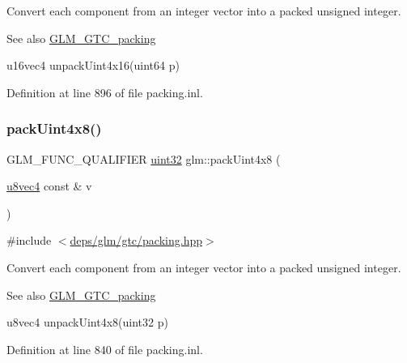 Convert each component from an integer vector into a packed unsigned integer.

\begin{DoxySeeAlso}{See also}
\hyperlink{group__gtc__packing}{G\+L\+M\+\_\+\+G\+T\+C\+\_\+packing} 

u16vec4 unpack\+Uint4x16(uint64 p) 
\end{DoxySeeAlso}


Definition at line 896 of file packing.\+inl.

\mbox{\label{group__gtc__packing_gaeb4262f799821affa62edf7067deaef9}} 
\subsubsection{\texorpdfstring{pack\+Uint4x8()}{packUint4x8()}}
{\footnotesize\ttfamily G\+L\+M\+\_\+\+F\+U\+N\+C\+\_\+\+Q\+U\+A\+L\+I\+F\+I\+ER \hyperlink{group__gtc__type__precision_ga202b6a53c105fcb7e531f9b443518451}{uint32} glm\+::pack\+Uint4x8 (\begin{DoxyParamCaption}\item[{\hyperlink{group__gtc__type__precision_ga6c8841fa492bd5b1078b171452fd6974}{u8vec4} const \&}]{v }\end{DoxyParamCaption})}



{\ttfamily \#include $<$\hyperlink{gtc_2packing_8hpp}{deps/glm/gtc/packing.\+hpp}$>$}

Convert each component from an integer vector into a packed unsigned integer.

\begin{DoxySeeAlso}{See also}
\hyperlink{group__gtc__packing}{G\+L\+M\+\_\+\+G\+T\+C\+\_\+packing} 

u8vec4 unpack\+Uint4x8(uint32 p) 
\end{DoxySeeAlso}


Definition at line 840 of file packing.\+inl.

\mbox{\label{group__gtc__packing_gaccd3f27e6ba5163eb7aa9bc8ff96251a}} 
